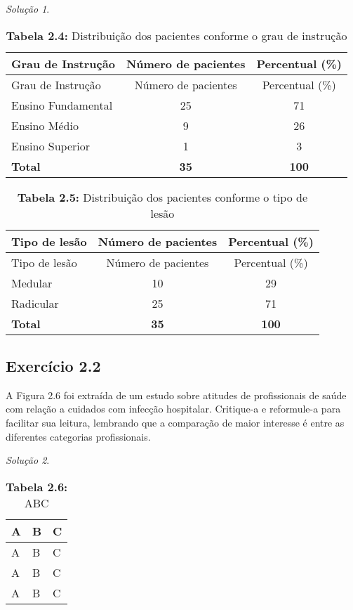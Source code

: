 \documentclass[
]{latex/krantz}
\theoremstyle{definition}
\theoremstyle{definition}
\theoremstyle{definition}
\theoremstyle{definition}
\theoremstyle{remark}
\newtheorem*{solution}{Solução}
\begin{document}
\begin{solution}
\begin{longtable}[]{@{}lcc@{}}
\caption{\textbf{Tabela 2.4:} Distribuição dos pacientes conforme o grau de instrução}\tabularnewline
\toprule\noalign{}
Grau de Instrução & Número de pacientes & Percentual (\%) \\
\midrule\noalign{}
\endfirsthead
\toprule\noalign{}
Grau de Instrução & Número de pacientes & Percentual (\%) \\
\midrule\noalign{}
\endhead
\bottomrule\noalign{}
\endlastfoot
Ensino Fundamental & 25 & 71 \\
Ensino Médio & 9 & 26 \\
Ensino Superior & 1 & 3 \\
\textbf{Total} & \textbf{35} & \textbf{100} \\
\end{longtable}

\begin{longtable}[]{@{}lcc@{}}
\caption{\textbf{Tabela 2.5:} Distribuição dos pacientes conforme o tipo de lesão}\tabularnewline
\toprule\noalign{}
Tipo de lesão & Número de pacientes & Percentual (\%) \\
\midrule\noalign{}
\endfirsthead
\toprule\noalign{}
Tipo de lesão & Número de pacientes & Percentual (\%) \\
\midrule\noalign{}
\endhead
\bottomrule\noalign{}
\endlastfoot
Medular & 10 & 29 \\
Radicular & 25 & 71 \\
\textbf{Total} & \textbf{35} & \textbf{100} \\
\end{longtable}

\end{solution}

\hypertarget{exr2-2}{%
\subsection*{Exercício 2.2}\label{exr2-2}}

A Figura 2.6 foi extraída de um estudo sobre atitudes de profissionais de saúde com relação a cuidados com infecção hospitalar. Critique-a e reformule-a para facilitar sua leitura, lembrando que a comparação de maior interesse é entre as diferentes categorias profissionais.

\begin{solution}
\leavevmode

\begin{longtable}[]{@{}lll@{}}
\caption{\textbf{Tabela 2.6:} ABC}\tabularnewline
\toprule\noalign{}
A & B & C \\
\midrule\noalign{}
\endfirsthead
\toprule\noalign{}
A & B & C \\
\midrule\noalign{}
\endhead
\bottomrule\noalign{}
\endlastfoot
A & B & C \\
A & B & C \\
\end{longtable}

\end{solution}
\end{document}
